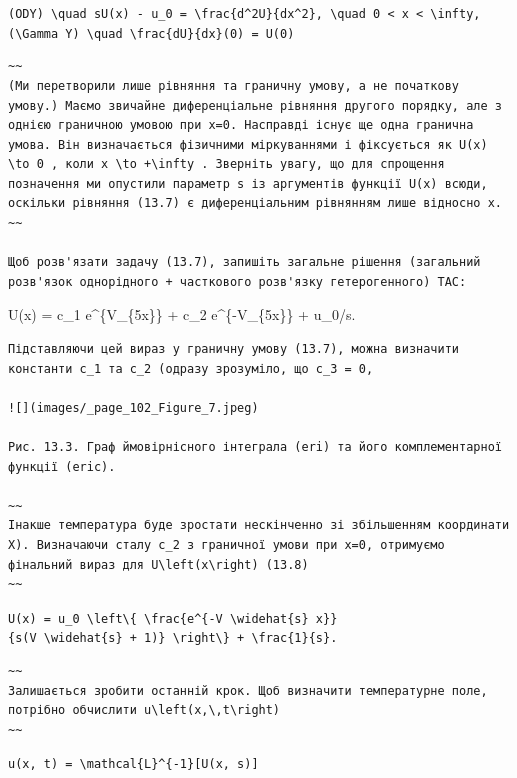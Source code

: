 \documentclass[
  ukrainian,
]{article}
\begin{document}
\texttt{(ODY)\ \textbackslash{}quad\ sU(x)\ -\ u\_0\ =\ \textbackslash{}frac\{d\^{}2U\}\{dx\^{}2\},\ \textbackslash{}quad\ 0\ \textless{}\ x\ \textless{}\ \textbackslash{}infty,}
\texttt{(\textbackslash{}Gamma\ Y)\ \textbackslash{}quad\ \textbackslash{}frac\{dU\}\{dx\}(0)\ =\ U(0)}

\begin{verbatim}
~~
(Ми перетворили лише рівняння та граничну умову, а не початкову умову.) Маємо звичайне диференціальне рівняння другого порядку, але з однією граничною умовою при x=0. Насправді існує ще одна гранична умова. Він визначається фізичними міркуваннями і фіксується як U(x) \to 0 , коли x \to +\infty . Зверніть увагу, що для спрощення позначення ми опустили параметр s із аргументів функції U(x) всюди, оскільки рівняння (13.7) є диференціальним рівнянням лише відносно x.
~~

Щоб розв'язати задачу (13.7), запишіть загальне рішення (загальний розв'язок однорідного + часткового розв'язку гетерогенного) TAC:
\end{verbatim}

U(x) = c\_1 e\^{}\{V\_\{5x\}\} + c\_2 e\^{}\{-V\_\{5x\}\} + u\_0/s.

\begin{verbatim}
Підставляючи цей вираз у граничну умову (13.7), можна визначити константи c_1 та c_2 (одразу зрозуміло, що c_3 = 0,

![](images/_page_102_Figure_7.jpeg)

Рис. 13.3. Граф ймовірнісного інтеграла (eri) та його комплементарної функції (eric).

~~
Інакше температура буде зростати нескінченно зі збільшенням координати X). Визначаючи сталу c_2 з граничної умови при x=0, отримуємо фінальний вираз для U\left(x\right) (13.8)
~~
\end{verbatim}

\texttt{U(x)\ =\ u\_0\ \textbackslash{}left\textbackslash{}\{\ \textbackslash{}frac\{e\^{}\{-V\ \textbackslash{}widehat\{s\}\ x\}\}\{s(V\ \textbackslash{}widehat\{s\}\ +\ 1)\}\ \textbackslash{}right\textbackslash{}\}\ +\ \textbackslash{}frac\{1\}\{s\}.}

\begin{verbatim}
~~
Залишається зробити останній крок. Щоб визначити температурне поле, потрібно обчислити u\left(x,\,t\right)
~~
\end{verbatim}

\texttt{u(x,\ t)\ =\ \textbackslash{}mathcal\{L\}\^{}\{-1\}{[}U(x,\ s){]}}
\end{document}

